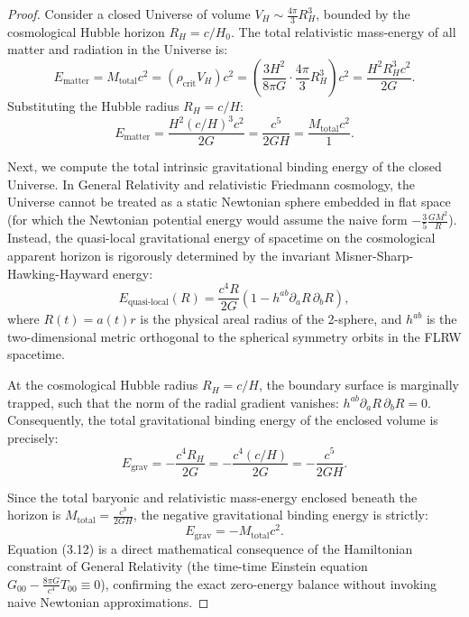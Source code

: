 \begin{proof}
Consider a closed Universe of volume $V_H \sim \frac{4\pi}{3} R_H^3$, bounded by the cosmological Hubble horizon $R_H = c/H_0$. The total relativistic mass-energy of all matter and radiation in the Universe is:
\begin{equation}\label{eq:3.8}\tag{3.8}
E_{\text{matter}} = M_{\text{total}} c^2 = \left( \rho_{\text{crit}} V_H \right) c^2 = \left( \frac{3 H^2}{8\pi G} \cdot \frac{4\pi}{3} R_H^3 \right) c^2 = \frac{H^2 R_H^3 c^2}{2 G}.
\end{equation}
Substituting the Hubble radius $R_H = c/H$:
\begin{equation}\label{eq:3.9}\tag{3.9}
E_{\text{matter}} = \frac{H^2 (c/H)^3 c^2}{2 G} = \frac{c^5}{2 G H} = \frac{M_{\text{total}} c^2}{1}.
\end{equation}

Next, we compute the total intrinsic gravitational binding energy of the closed Universe. In General Relativity and relativistic Friedmann cosmology, the Universe cannot be treated as a static Newtonian sphere embedded in flat space (for which the Newtonian potential energy would assume the naive form $-\frac{3}{5} \frac{G M^2}{R}$). Instead, the quasi-local gravitational energy of spacetime on the cosmological apparent horizon is rigorously determined by the invariant Misner-Sharp-Hawking-Hayward energy:
\begin{equation}\label{eq:3.10}\tag{3.10}
E_{\text{quasi-local}}(R) = \frac{c^4 R}{2G} \left( 1 - h^{ab} \partial_a R \, \partial_b R \right),
\end{equation}
where $R(t) = a(t) r$ is the physical areal radius of the 2-sphere, and $h^{ab}$ is the two-dimensional metric orthogonal to the spherical symmetry orbits in the FLRW spacetime.

At the cosmological Hubble radius $R_H = c/H$, the boundary surface is marginally trapped, such that the norm of the radial gradient vanishes: $h^{ab} \partial_a R \, \partial_b R = 0$. Consequently, the total gravitational binding energy of the enclosed volume is precisely:
\begin{equation}\label{eq:3.11}\tag{3.11}
E_{\text{grav}} = -\frac{c^4 R_H}{2G} = -\frac{c^4 (c/H)}{2G} = -\frac{c^5}{2GH}.
\end{equation}

Since the total baryonic and relativistic mass-energy enclosed beneath the horizon is $M_{\text{total}} = \frac{c^3}{2GH}$, the negative gravitational binding energy is strictly:
\begin{equation}\label{eq:3.12}\tag{3.12}
E_{\text{grav}} = -M_{\text{total}} c^2.
\end{equation}
Equation (3.12) is a direct mathematical consequence of the Hamiltonian constraint of General Relativity (the time-time Einstein equation $G_{00} - \frac{8\pi G}{c^4} T_{00} \equiv 0$), confirming the exact zero-energy balance without invoking naive Newtonian approximations.


\end{proof}
